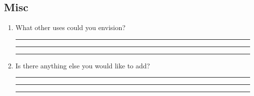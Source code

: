 \documentclass[10pt,a4paper]{scrartcl}
\begin{document}
\subsection{Misc}
\begin{enumerate}
\item What other uses could you envision?\\
\rule{\linewidth}{0.25pt}
\rule{\linewidth}{0.25pt}
\rule{\linewidth}{0.25pt}



\item Is there anything else you would like to add?\\
\rule{\linewidth}{0.25pt}
\rule{\linewidth}{0.25pt}
\rule{\linewidth}{0.25pt}
\end{enumerate}
\end{document}
